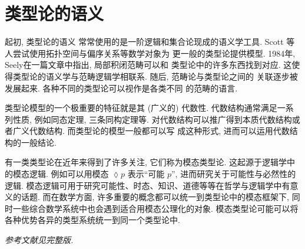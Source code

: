\documentclass[UTF8, zihao=-4]{ctexart}
\theoremstyle{plain}
\theoremstyle{definition}
\theoremstyle{remark}
\begin{document}
\section*{类型论的语义}

起初, 类型论的语义
常常使用的是一阶逻辑和集合论现成的语义学工具.
Scott 等人尝试使用拓扑空间与偏序关系等数学对象为
更一般的类型论提供模型. 1984年,
Seely在一篇文章中指出, 局部积闭范畴可以和
类型论中的许多东西找到对应.
这使得类型论的语义学与范畴逻辑学相联系.
随后, 范畴论与类型论之间的
关联逐步被发展起来. 各种不同的类型论可以视作是各类不同
的范畴的语言.

类型论模型的一个极重要的特征就是其 (广义的) 代数性.
代数结构通常满足一系列性质, 例如同态定理, 三条同构定理等.
对代数结构可以推广得到本质代数结构或者广义代数结构.
而类型论的模型一般都可以写
成这种形式, 进而可以运用代数结构的一般结论.

有一类类型论在近年来得到了许多关注, 它们称为模态类型论.
这起源于逻辑学中的模态逻辑. 例如可以用模态 $\lozenge p$
表示“可能 $p$”, 进而研究关于可能性与必然性的逻辑.
模态逻辑可用于研究可能性、时态、知识、道德等等在哲学与逻辑学中有意义的话题.
而在数学方面, 许多重要的概念都可以统一到类型论中的模态框架下,
同时一些综合数学系统中也会遇到适合用模态公理化的对象.
模态类型论可能可以将各种优势各异的类型系统统一到同一个类型论中.

\vspace*{\fill}

\emph{参考文献见完整版.}
\end{document}

